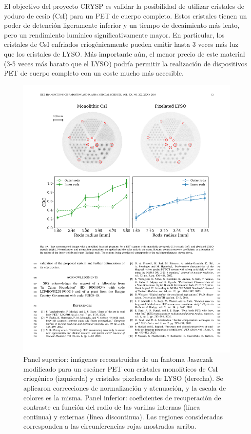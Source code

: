 \documentclass[12pt,a4paper,article]{report} %
\begin{document}
El objectivo del proyecto CRYSP es validar la posibilidad de utilizar cristales de yoduro de cesio (CsI) para un PET de cuerpo completo. Estos cristales tienen un poder de detención ligeramente inferior y un tiempo de decaimiento más lento, pero un rendimiento lumínico significativamente mayor. En particular, los cristales de CsI enfriados criogénicamente pueden emitir hasta 3 veces más luz que los cristales de LYSO. Más importante aún, el menor precio de este material (3-5 veces más barato que el LYSO) podría permitir la realización de dispositivos PET de cuerpo completo con un coste mucho más accesible.


\begin{figure}[ht!]
  \begin{center}
  \includegraphics[width=0.9\linewidth]{img/fbpet_sim.pdf}
  \caption{Panel superior: imágenes reconstruidas de un fantoma Jaszczak modificado para un escáner PET con cristales monolíticos de CsI criogénico (izquierda) y cristales pixeleados de LYSO (derecha). Se aplicaron correcciones de normalización y atenuación, y la escala de colores es la misma. Panel inferior: coeficientes de recuperación de contraste en función del radio de las varillas internas (línea continua) y externas (línea discontinua). Las regiones consideradas corresponden a las circunferencias rojas mostradas arriba.}\label{fig:fbpet}
  \end{center}
  \end{figure}
\end{document}
